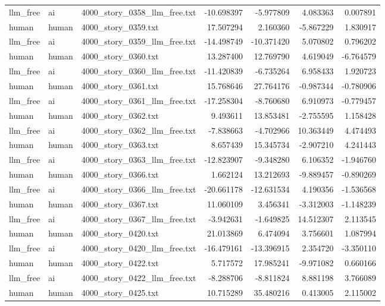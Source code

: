 \begin{longtable}{lllrrrr}
llm\_free & ai & 4000\_story\_0358\_llm\_free.txt & -10.698397 & -5.977809 & 4.083363 & 0.007891 \\
human & human & 4000\_story\_0359.txt & 17.507294 & 2.160360 & -5.867229 & 1.830917 \\
llm\_free & ai & 4000\_story\_0359\_llm\_free.txt & -14.498749 & -10.371420 & 5.070802 & 0.796202 \\
human & human & 4000\_story\_0360.txt & 13.287400 & 12.769790 & 4.619049 & -6.764579 \\
llm\_free & ai & 4000\_story\_0360\_llm\_free.txt & -11.420839 & -6.735264 & 6.958433 & 1.920723 \\
human & human & 4000\_story\_0361.txt & 15.768646 & 27.764176 & -0.987344 & -0.780906 \\
llm\_free & ai & 4000\_story\_0361\_llm\_free.txt & -17.258304 & -8.760680 & 6.910973 & -0.779457 \\
human & human & 4000\_story\_0362.txt & 9.493611 & 13.853481 & -2.755595 & 1.158428 \\
llm\_free & ai & 4000\_story\_0362\_llm\_free.txt & -7.838663 & -4.702966 & 10.363449 & 4.474493 \\
human & human & 4000\_story\_0363.txt & 8.657439 & 15.345734 & -2.907210 & 4.241443 \\
llm\_free & ai & 4000\_story\_0363\_llm\_free.txt & -12.823907 & -9.348280 & 6.106352 & -1.946760 \\
human & human & 4000\_story\_0366.txt & 1.662124 & 13.212693 & -9.889457 & -0.890269 \\
llm\_free & ai & 4000\_story\_0366\_llm\_free.txt & -20.661178 & -12.631534 & 4.190356 & -1.536568 \\
human & human & 4000\_story\_0367.txt & 11.060109 & 3.456341 & -3.312003 & -1.148239 \\
llm\_free & ai & 4000\_story\_0367\_llm\_free.txt & -3.942631 & -1.649825 & 14.512307 & 2.113545 \\
human & human & 4000\_story\_0420.txt & 21.013869 & 6.474094 & 3.756601 & 1.087994 \\
llm\_free & ai & 4000\_story\_0420\_llm\_free.txt & -16.479161 & -13.396915 & 2.354720 & -3.350110 \\
human & human & 4000\_story\_0422.txt & 5.717572 & 17.985241 & -9.971082 & 0.660166 \\
llm\_free & ai & 4000\_story\_0422\_llm\_free.txt & -8.288706 & -8.811824 & 8.881198 & 3.766089 \\
human & human & 4000\_story\_0425.txt & 10.715289 & 35.480216 & 0.413005 & 2.115002 \\

\end{longtable}

